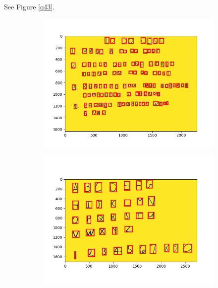 \documentclass{article} %
\begin{document}
    See Figure \ref{q43}.
    
    \begin{figure}[H]
        \centering
        \begin{subfigure}[b]{0.49\textwidth}
            \includegraphics[width=\textwidth]{4,2 img1.png}
        \end{subfigure}
        \begin{subfigure}[b]{0.49\textwidth}
            \includegraphics[width=\textwidth]{4,2 img2.png}
        \end{subfigure}
        \begin{subfigure}[b]{0.49\textwidth}

\end{subfigure}
\end{figure}
\end{document}
